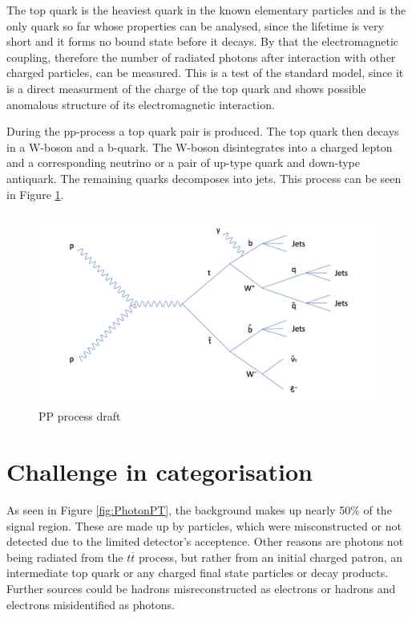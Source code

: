 \documentclass[11pt]{scrartcl}
\begin{document}
	The top quark is the heaviest quark in the known elementary particles and is the only quark so far whose properties can be analysed, since the lifetime is very short and it forms no bound state before it decays. By that the electromagnetic coupling, therefore the number of radiated photons after interaction with other charged particles, can be measured. This is a test of the standard model, since it is a direct measurment of the charge of the top quark and shows possible anomalous structure of its electromagnetic interaction.
	
	During the pp-process a top quark pair is produced. The top quark then decays in a W-boson and a b-quark. The W-boson disintegrates into a charged lepton and a corresponding neutrino or a pair of up-type quark and down-type antiquark. The remaining quarks decomposes into jets. This process can be seen in Figure \ref{fig:PPprocess}.
	
	\begin{figure}[H]
	\centering
	\includegraphics[width=1\textwidth]{figures/PP_process.png}
	\caption{PP process draft}
 	\label{fig:PPprocess}
	\end{figure}
	
\section{Challenge in categorisation}

As seen in Figure \ref{fig:PhotonPT}, the background makes up nearly 50\% of the signal region. These are made up by particles, which were misconstructed or not detected due to the limited detector's acceptence. Other reasons are photons not being radiated from the $t\overline{t}$ process, but rather from an initial charged patron, an intermediate top quark or any charged final state particles or decay products. Further sources could be hadrons misreconstructed as electrons or hadrons and electrons misidentified as photons. 
\end{document}
